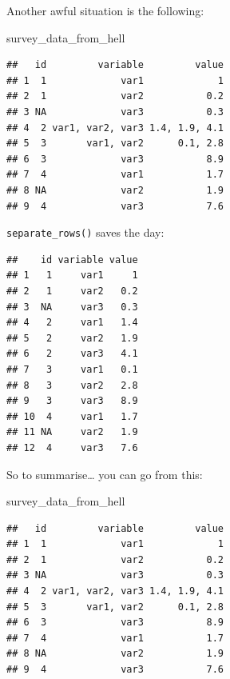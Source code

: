 \documentclass[]{gitbook}
\newenvironment{Shaded}{\begin{snugshade}}{\end{snugshade}}
\newcommand{\KeywordTok}[1]{\textcolor[rgb]{0.13,0.29,0.53}{\textbf{#1}}}
\newcommand{\NormalTok}[1]{#1}
\newcommand{\OperatorTok}[1]{\textcolor[rgb]{0.81,0.36,0.00}{\textbf{#1}}}
\newcommand{\StringTok}[1]{\textcolor[rgb]{0.31,0.60,0.02}{#1}}
\theoremstyle{definition}
\theoremstyle{definition}
\theoremstyle{definition}
\theoremstyle{remark}
\begin{document}
Another awful situation is the following:

\begin{Shaded}
\begin{Highlighting}[]
\NormalTok{survey_data_from_hell}
\end{Highlighting}
\end{Shaded}

\begin{verbatim}
##   id         variable         value
## 1  1             var1             1
## 2  1             var2           0.2
## 3 NA             var3           0.3
## 4  2 var1, var2, var3 1.4, 1.9, 4.1
## 5  3       var1, var2      0.1, 2.8
## 6  3             var3           8.9
## 7  4             var1           1.7
## 8 NA             var2           1.9
## 9  4             var3           7.6
\end{verbatim}

\texttt{separate\_rows()} saves the day:

\begin{Shaded}
\end{Shaded}

\begin{verbatim}
##    id variable value
## 1   1     var1     1
## 2   1     var2   0.2
## 3  NA     var3   0.3
## 4   2     var1   1.4
## 5   2     var2   1.9
## 6   2     var3   4.1
## 7   3     var1   0.1
## 8   3     var2   2.8
## 9   3     var3   8.9
## 10  4     var1   1.7
## 11 NA     var2   1.9
## 12  4     var3   7.6
\end{verbatim}

So to summarise\ldots{} you can go from this:

\begin{Shaded}
\begin{Highlighting}[]
\NormalTok{survey_data_from_hell}
\end{Highlighting}
\end{Shaded}

\begin{verbatim}
##   id         variable         value
## 1  1             var1             1
## 2  1             var2           0.2
## 3 NA             var3           0.3
## 4  2 var1, var2, var3 1.4, 1.9, 4.1
## 5  3       var1, var2      0.1, 2.8
## 6  3             var3           8.9
## 7  4             var1           1.7
## 8 NA             var2           1.9
## 9  4             var3           7.6
\end{verbatim}
\end{document}

